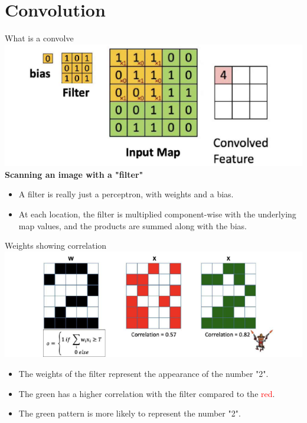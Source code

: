 \documentclass[default, aspectratio=169]{beamer}
\begin{document}
	
	\section{Convolution}
	\begin{frame}{What is a convolve}
		\centering
		\includegraphics[keepaspectratio, scale=0.9]{pic/convo.png}
		\\
		\textbf{Scanning an image with a "filter"}
		
		\begin{itemize}
			\item A filter is really just a perceptron, with weights and a bias.
			\item At each location, the filter is multiplied component-wise with the underlying map values, and the products are summed along with the bias.
		\end{itemize}
		
	\end{frame}
	\begin{frame}{Weights showing correlation}
		\centering
		\includegraphics[keepaspectratio, scale=0.9]{pic/corr.png}
		\begin{itemize}
			\item The weights of the filter represent the appearance of the number "2".
			\item The \textcolor{deepgreen}{green} has a higher correlation with the filter compared to the \textcolor{red}{red}.
			\item The \textcolor{deepgreen}{green pattern} is more likely to represent the number "2".
		\end{itemize}
	\end{frame}
\end{document}
